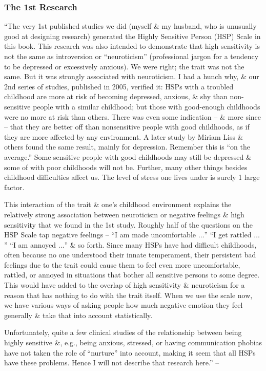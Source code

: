 \documentclass{article}
\numberwithin{equation}{section}
\begin{document}
\subsubsection*{The 1st Research}
``The very 1st published studies we did (myself \& my husband, who is unusually good at designing research) generated the Highly Sensitive Person (HSP) Scale in this book. This research was also intended to demonstrate that high sensitivity is not the same as introversion or ``neuroticism'' (professional jargon for a tendency to be depressed or excessively anxious). We were right; the trait was not the same. But it was strongly associated with neuroticism. I had a hunch why, \& our 2nd series of studies, published in 2005, verified it: HSPs with a troubled childhood are more at risk of becoming depressed, anxious, \& shy than non-sensitive people with a similar childhood; but those with good-enough childhoods were no more at risk than others. There was even some indication -- \& more since -- that they are better off than nonsensitive people with good childhoods, as if they are more affected by any environment. A later study by Miriam Liss \& others found the same result, mainly for depression. Remember this is ``on the average.'' Some sensitive people with good childhoods may still be depressed \& some of with poor childhoods will not be. Further, many other things besides childhood difficulties affect us. The level of stress one lives under is surely 1 large factor.

This interaction of the trait \& one's childhood environment explains the relatively strong association between neuroticism or negative feelings \& high sensitivity that we found in the 1st study. Roughly half of the questions on the HSP Scale tap negative feelings -- ``I am made uncomfortable $\ldots$'' ``I get rattled $\ldots$'' ``I am annoyed $\ldots$'' \& so forth. Since many HSPs have had difficult childhoods, often because no one understood their innate temperament, their persistent bad feelings due to the trait could cause them to feel even more uncomfortable, rattled, or annoyed in situations that bother all sensitive persons to some degree. This would have added to the overlap of high sensitivity \& neuroticism for a reason that has nothing to do with the trait itself. When we use the scale now, we have various ways of asking people how much negative emotion they feel generally \& take that into account statistically.

Unfortunately, quite a few clinical studies of the relationship between being highly sensitive \&, e.g., being anxious, stressed, or having communication phobias have not taken the role of ``nurture'' into account, making it seem that all HSPs have these  problems. Hence I will not describe that research here.'' -- \cite[pp. 11--12]{Aron2013}
\end{document}
